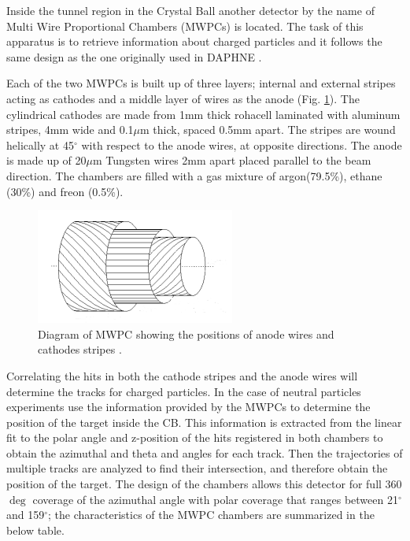\indent Inside the tunnel region in the Crystal Ball another detector by the name of Multi Wire Proportional Chambers (MWPCs) is located. The task of this apparatus is to retrieve  information  about  charged particles and it follows  the  same design  as the  one originally used in DAPHNE \cite{audit}.

\indent Each of the two MWPCs is built up of three layers; internal and external stripes acting as cathodes and a middle layer of wires as the anode (Fig. \ref{mwpc}). The cylindrical  cathodes  are  made  from  1mm  thick  rohacell  laminated  with aluminum stripes, 4mm wide and  0.1$\mu$m thick, spaced 0.5mm apart. The stripes are  wound  helically  at  45$^{\circ}$  with  respect  to  the  anode  wires, at  opposite directions.  The  anode  is  made  up  of  20$\mu$m  Tungsten  wires  2mm  apart placed parallel to the beam direction. The chambers are filled with a gas mixture of argon(79.5\%), ethane (30\%) and freon (0.5\%).

\begin{figure}[H]
\begin{center}
\includegraphics[scale=1.0]{pictures/png/mwpc.png}
\caption{Diagram of MWPC showing the positions of anode wires and cathodes stripes \cite{jalbert}.}
\label{mwpc}
\end{center}
\end{figure}


\indent Correlating  the  hits  in  both  the cathode  stripes  and  the  anode  wires  will determine the tracks for charged particles. In the case of neutral particles experiments use the information provided by the MWPCs to determine the position of the target inside the CB. This information is extracted from the linear fit to the polar angle and z-position of the hits registered in both chambers to obtain the azimuthal and theta and angles for each track. Then the trajectories of multiple tracks are analyzed to find their intersection, and therefore obtain the position of the target. The design of the chambers allows this detector for full 360$\deg$ coverage of the azimuthal angle with polar coverage that ranges between 21$^{\circ}$ and 159$^{\circ}$; the characteristics of the MWPC chambers are summarized in the below table.

